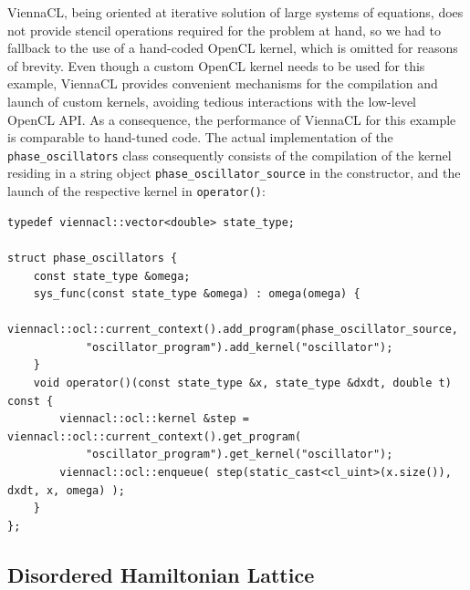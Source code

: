 \documentclass[final]{siamltex}
\newcommand{\code}[1]{\lstinline|#1|}
\begin{document}
ViennaCL, being oriented at iterative solution of large systems of equations,
does not provide stencil operations required for the problem at hand, so we had
to fallback to the use of a hand-coded OpenCL kernel, which is omitted for reasons of brevity.
Even though a custom OpenCL kernel needs to be used for this example,
ViennaCL provides convenient mechanisms for the compilation and launch of custom
kernels, avoiding tedious interactions with the low-level OpenCL API.
As a consequence, the performance of ViennaCL for this example is comparable to hand-tuned code.
The actual implementation of the \code{phase_oscillators} class consequently consists
of the compilation of the kernel residing in a string object \code{phase_oscillator_source} in the constructor,
and the launch of the respective kernel in \code{operator()}:
\begin{lstlisting}
typedef viennacl::vector<double> state_type;

struct phase_oscillators {
    const state_type &omega;
    sys_func(const state_type &omega) : omega(omega) {
        viennacl::ocl::current_context().add_program(phase_oscillator_source,
            "oscillator_program").add_kernel("oscillator");
    }
    void operator()(const state_type &x, state_type &dxdt, double t) const {
        viennacl::ocl::kernel &step = viennacl::ocl::current_context().get_program(
            "oscillator_program").get_kernel("oscillator");
        viennacl::ocl::enqueue( step(static_cast<cl_uint>(x.size()), dxdt, x, omega) );
    }
};
\end{lstlisting}








%
%
\subsection{Disordered Hamiltonian Lattice}
\end{document}
